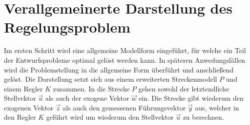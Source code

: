 \section{Verallgemeinerte Darstellung des Regelungsproblem}
Im ersten Schritt wird eine allgemeine Modellform eingeführt, für welche ein Teil der Entwurfsprobleme optimal gelöst werden kann. In späteren Anwedungsfällen wird die Problemstellung in die allgemeine Form überführt und anschließend gelöst. Die Darstellung setzt sich aus einem erweiterten Streckenmodell $P$ und einem Regler $K$ zusammen. In die Strecke $P$ gehen sowohl der letztendliche Stellvektor $\vec{u}$ als auch der exogene Vektor $\vec{w}$ ein. Die Strecke gibt wiederum den exogenen Vektor $\vec{z}$ als auch den gemessenen Führungsvektor $\vec{y}$ aus, welcher in den Regler $K$ geführt wird um wiederum den Stellvektor $\vec{u}$ zu berechnen.
